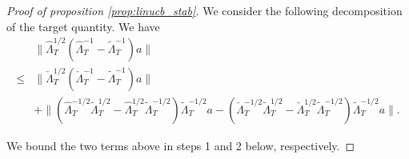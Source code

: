 \documentclass[11pt]{article}
\begin{document}
\begin{proof}[Proof of proposition \ref{prop:linucb_stab}]
We consider the following decomposition of the target quantity. We have
\begin{align}
    &\|\widehat \Lambda_T^{1/2} \left( \widehat \Lambda_T^{-1} - \widetilde \Lambda_T^{-1} \right) a \| \nonumber\\
    \leq& \|\check \Lambda_T^{1/2} \left( \check \Lambda_T^{-1} - \widetilde \Lambda_T^{-1} \right) a \| \label{eq: stability_rate_term_1}\\ 
    &+ \|(\widehat \Lambda_T^{-1/2} \widetilde\Lambda_T^{1/2} - \widehat \Lambda_T^{1/2} \widetilde\Lambda_T^{-1/2}) \widetilde\Lambda_T^{-1/2} a - (\check \Lambda_T^{-1/2} \widetilde\Lambda_T^{1/2} - \check \Lambda_T^{1/2} \widetilde\Lambda_T^{-1/2}) \widetilde\Lambda_T^{-1/2} a \|. \label{eq: stability_rate_term_2}
\end{align}

We bound the two terms above in steps 1 and 2 below, respectively.


\end{proof}
\end{document}
